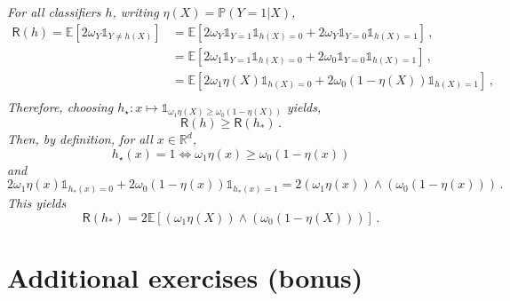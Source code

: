 \documentclass[a4paper,10pt,fleqn]{article}
\newcommand{\eqsp}{\,}
\newcommand{\bP}{\mathbb{P}}
\newcommand{\1}{\ensuremath{\mathbbm{1}}}
\newcommand{\bE}{\mathbb{E}}
\begin{document}
{\em
For all classifiers $h$, writing $\eta(X) = \bP(Y=1|X)$,
\begin{align*}
\mathsf{R}(h) = \bE[2\omega_Y \mathds{1}_{Y\neq h(X)}] &= \bE[2\omega_Y \mathds{1}_{Y=1}\mathds{1}_{h(X)=0} + 2\omega_Y \mathds{1}_{Y=0}\mathds{1}_{h(X)=1}]\eqsp,\\ 
&= \bE[2\omega_1 \mathds{1}_{Y=1}\mathds{1}_{h(X)=0} + 2\omega_0 \mathds{1}_{Y=0}\mathds{1}_{h(X)=1}]\eqsp,\\ 
&= \bE[2\omega_1 \eta(X)\mathds{1}_{h(X)=0} + 2\omega_0 (1-\eta(X))\mathds{1}_{h(X)=1}]\eqsp,\\ 
\end{align*}
Therefore, choosing $h_\star:x\mapsto \mathds{1}_{\omega_1 \eta(X)\geqslant \omega_0 (1-\eta(X))}$ yields,
$$
\mathsf{R}(h) \geqslant \mathsf{R}(h_*)\eqsp. 
$$
Then, by definition, for all $x\in\mathbb{R}^d$,
$$
h_\star(x) = 1 \Leftrightarrow \omega_1 \eta(x) \geqslant \omega_0 (1-\eta(x))
$$
and 
$$
2\omega_1 \eta(x)\mathds{1}_{h_*(x)=0} + 2\omega_0 (1-\eta(x))\mathds{1}_{h_*(x)=1} = 2 \left(\omega_1 \eta(x)\right) \wedge \left(\omega_0 (1-\eta(x))\right)\eqsp.
$$
This yields
$$
\mathsf{R}(h_*) = 2\bE[ \left(\omega_1 \eta(X)\right) \wedge \left(\omega_0 (1-\eta(X))\right)]\eqsp.
$$
}


\section{Additional exercises (bonus)}
\end{document}
